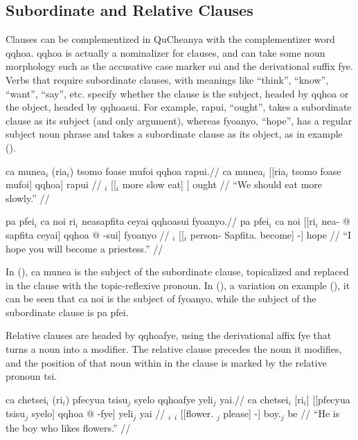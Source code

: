 \documentclass{article}
\begin{document}
\subsection{Subordinate and Relative Clauses}

Clauses can be complementized in QuCheanya with the complementizer word {\quch qqhoa}.  {\quch qqhoa} is actually a nominalizer for clauses, and can take some noun morphology such as the accusative case marker {\quch sui} and the derivational suffix {\quch fye}.  Verbs that require subordinate clauses, with meanings like ``think'', ``know'', ``want'', ``say'', etc. specify whether the clause is the subject, headed by {\quch qqhoa} or the object, headed by {\quch qqhoasui}.  For example, {\quch rapui}, ``ought'', takes a subordinate clause as its subject (and only argument), whereas {\quch fyoanyo}, ``hope'', has a regular subject noun phrase and takes a subordinate clause as its object, as in example ().

\ex[lingstyle=QuCheanya,tag=ought] \begingl
\glpreamble ca munea$_i$ (ria$_i$) tsomo foase mufoi qqhoa rapui.//
\gla ca munea$_i$ [[ria$_i$ tsomo foase mufoi] qqhoa] rapui //
\glb {} $_i$ [[$_i$ more slow eat] ] ought //
\glft ``We should eat more slowly.'' //
\endgl \xe

\ex[lingstyle=QuCheanya,tag=hopeyou] \begingl
\glpreamble pa pfei$_i$ ca noi ri$_i$ neasapfita ceyai qqhoasui fyoanyo.//
\gla pa pfei$_i$ ca noi [[ri$_i$ nea- @ sapfita ceyai] qqhoa @ -sui] fyoanyo //
\glb {} $_i$   [[$_i$ person- Sapfita. become]  -] hope //
\glft ``I hope you will become a priestess.'' //
\endgl \xe

In (), {\quch ca munea} is the subject of the subordinate clause, topicalized and replaced in the clause with the topic-reflexive pronoun.  In (), a variation on example (), it can be seen that {\quch ca noi} is the subject of {\quch fyoanyo}, while the subject of the subordinate clause is {\quch pa pfei}.

Relative clauses are headed by {\quch qqhoafye}, using the derivational affix {\quch fye} that turns a noun into a modifier.  The relative clause precedes the noun it modifies, and the position of that noun within in the clause is marked by the relative pronoun {\quch tsi}.

\ex[lingstyle=QuCheanya] \begingl
\glpreamble ca chetsei$_i$ (ri$_i$) pfecyua tsisu$_j$ syelo qqhoafye yeli$_j$ yai.//
\gla ca chetsei$_i$ [ri$_i$] [[pfecyua tsisu$_j$ syelo] qqhoa @ -fye] yeli$_j$ yai //
\glb {} $_i$ $_i$ [[flower. $_j$ please]  -] boy.$_j$ be //
\glft ``He is the boy who likes flowers.'' //
\endgl \xe
\end{document}
